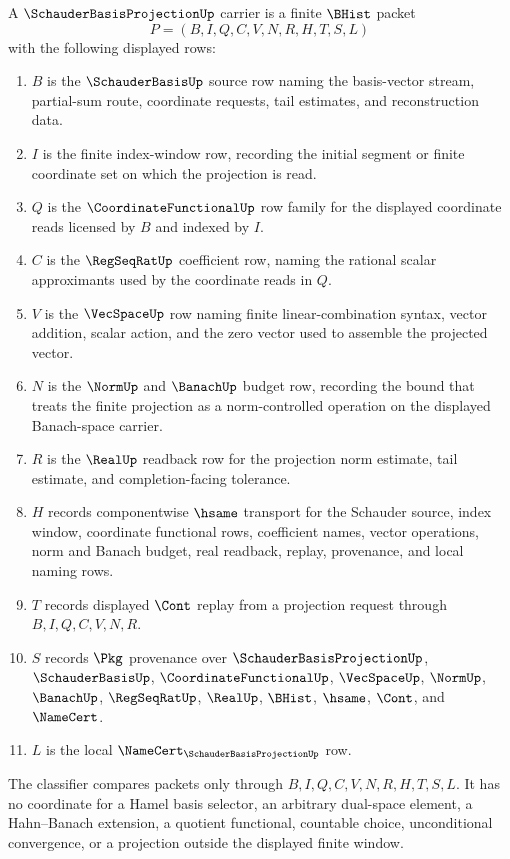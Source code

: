 \begin{definition}
\label{def:schauder-basis-projection-carrier}
A $\SchauderBasisProjectionUp$ carrier is a finite $\BHist$ packet
$$
P=(B,I,Q,C,V,N,R,H,T,S,L)
$$
with the following displayed rows:
\begin{enumerate}
\item $B$ is the $\SchauderBasisUp$ source row naming the basis-vector stream, partial-sum route, coordinate requests, tail estimates, and reconstruction data.
\item $I$ is the finite index-window row, recording the initial segment or finite coordinate set on which the projection is read.
\item $Q$ is the $\CoordinateFunctionalUp$ row family for the displayed coordinate reads licensed by $B$ and indexed by $I$.
\item $C$ is the $\RegSeqRatUp$ coefficient row, naming the rational scalar approximants used by the coordinate reads in $Q$.
\item $V$ is the $\VecSpaceUp$ row naming finite linear-combination syntax, vector addition, scalar action, and the zero vector used to assemble the projected vector.
\item $N$ is the $\NormUp$ and $\BanachUp$ budget row, recording the bound that treats the finite projection as a norm-controlled operation on the displayed Banach-space carrier.
\item $R$ is the $\RealUp$ readback row for the projection norm estimate, tail estimate, and completion-facing tolerance.
\item $H$ records componentwise $\hsame$ transport for the Schauder source, index window, coordinate functional rows, coefficient names, vector operations, norm and Banach budget, real readback, replay, provenance, and local naming rows.
\item $T$ records displayed $\Cont$ replay from a projection request through $B,I,Q,C,V,N,R$.
\item $S$ records $\Pkg$ provenance over $\SchauderBasisProjectionUp$, $\SchauderBasisUp$, $\CoordinateFunctionalUp$, $\VecSpaceUp$, $\NormUp$, $\BanachUp$, $\RegSeqRatUp$, $\RealUp$, $\BHist$, $\hsame$, $\Cont$, and $\NameCert$.
\item $L$ is the local $\NameCert_{\SchauderBasisProjectionUp}$ row.
\end{enumerate}
The classifier compares packets only through $B,I,Q,C,V,N,R,H,T,S,L$. It has no coordinate for a Hamel basis selector, an arbitrary dual-space element, a Hahn--Banach extension, a quotient functional, countable choice, unconditional convergence, or a projection outside the displayed finite window.
\end{definition}

